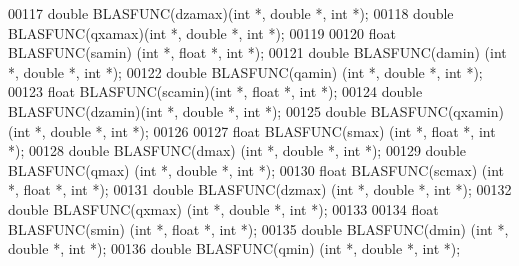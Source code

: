 \begin{DoxyCode}
00117 \textcolor{keywordtype}{double} BLASFUNC(dzamax)(\textcolor{keywordtype}{int} *, \textcolor{keywordtype}{double} *, \textcolor{keywordtype}{int} *);
00118 \textcolor{keywordtype}{double} BLASFUNC(qxamax)(\textcolor{keywordtype}{int} *, \textcolor{keywordtype}{double} *, \textcolor{keywordtype}{int} *);
00119 
00120 \textcolor{keywordtype}{float}  BLASFUNC(samin) (\textcolor{keywordtype}{int} *, \textcolor{keywordtype}{float}  *, \textcolor{keywordtype}{int} *);
00121 \textcolor{keywordtype}{double} BLASFUNC(damin) (\textcolor{keywordtype}{int} *, \textcolor{keywordtype}{double} *, \textcolor{keywordtype}{int} *);
00122 \textcolor{keywordtype}{double} BLASFUNC(qamin) (\textcolor{keywordtype}{int} *, \textcolor{keywordtype}{double} *, \textcolor{keywordtype}{int} *);
00123 \textcolor{keywordtype}{float}  BLASFUNC(scamin)(\textcolor{keywordtype}{int} *, \textcolor{keywordtype}{float}  *, \textcolor{keywordtype}{int} *);
00124 \textcolor{keywordtype}{double} BLASFUNC(dzamin)(\textcolor{keywordtype}{int} *, \textcolor{keywordtype}{double} *, \textcolor{keywordtype}{int} *);
00125 \textcolor{keywordtype}{double} BLASFUNC(qxamin)(\textcolor{keywordtype}{int} *, \textcolor{keywordtype}{double} *, \textcolor{keywordtype}{int} *);
00126 
00127 \textcolor{keywordtype}{float}  BLASFUNC(smax)  (\textcolor{keywordtype}{int} *, \textcolor{keywordtype}{float}  *, \textcolor{keywordtype}{int} *);
00128 \textcolor{keywordtype}{double} BLASFUNC(dmax)  (\textcolor{keywordtype}{int} *, \textcolor{keywordtype}{double} *, \textcolor{keywordtype}{int} *);
00129 \textcolor{keywordtype}{double} BLASFUNC(qmax)  (\textcolor{keywordtype}{int} *, \textcolor{keywordtype}{double} *, \textcolor{keywordtype}{int} *);
00130 \textcolor{keywordtype}{float}  BLASFUNC(scmax) (\textcolor{keywordtype}{int} *, \textcolor{keywordtype}{float}  *, \textcolor{keywordtype}{int} *);
00131 \textcolor{keywordtype}{double} BLASFUNC(dzmax) (\textcolor{keywordtype}{int} *, \textcolor{keywordtype}{double} *, \textcolor{keywordtype}{int} *);
00132 \textcolor{keywordtype}{double} BLASFUNC(qxmax) (\textcolor{keywordtype}{int} *, \textcolor{keywordtype}{double} *, \textcolor{keywordtype}{int} *);
00133 
00134 \textcolor{keywordtype}{float}  BLASFUNC(smin)  (\textcolor{keywordtype}{int} *, \textcolor{keywordtype}{float}  *, \textcolor{keywordtype}{int} *);
00135 \textcolor{keywordtype}{double} BLASFUNC(dmin)  (\textcolor{keywordtype}{int} *, \textcolor{keywordtype}{double} *, \textcolor{keywordtype}{int} *);
00136 \textcolor{keywordtype}{double} BLASFUNC(qmin)  (\textcolor{keywordtype}{int} *, \textcolor{keywordtype}{double} *, \textcolor{keywordtype}{int} *);

\end{DoxyCode}
